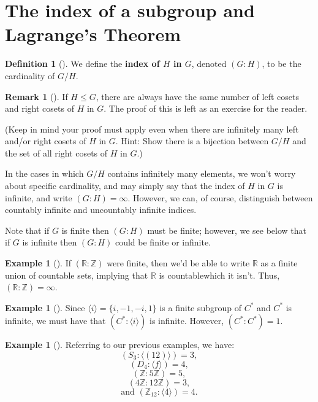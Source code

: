 \documentclass[10pt,]{book}
\newcommand{\terminology}[1]{\textbf{#1}}
\theoremstyle{plain}
\theoremstyle{definition}
\newtheorem{definition}[theorem]{Definition}
\theoremstyle{definition}
\newtheorem{remark}[theorem]{Remark}
\theoremstyle{definition}
\newtheorem{example}[theorem]{Example}
\theoremstyle{definition}
\numberwithin{equation}{section}
\def\Z{\mathbb{Z}}
\def\R{\mathbb{R}}
\begin{document}
\section[{The index of a subgroup and Lagrange's Theorem}]{The index of a subgroup and Lagrange's Theorem}\label{section-24}
\begin{definition}[{}]\label{definition-65}
\label{notation-73}
We define the \terminology{index of \(H\) in \(G\)}, denoted \((G:H)\), to be the cardinality of \(G/H\).%
\end{definition}
\begin{remark}[]\label{remark-41}
If \(H\leq G\), there are always have the same number of left cosets and right cosets of \(H\) in \(G\).  The proof of this is left as an exercise for the reader.%
\par
(Keep in mind your proof must apply even when there are infinitely many left and/or right cosets of \(H\) in \(G\).  Hint: Show there is a bijection between \(G/H\) and the set of all right cosets of \(H\) in \(G\).)%
\end{remark}
In the cases in which \(G/H\) contains infinitely many elements, we won't worry about specific cardinality, and may simply say that the index of \(H\) in \(G\) is infinite, and write \((G:H)=\infty\). However, we can, of course, distinguish between countably infinite and uncountably infinite indices.%
\par
Note that if \(G\) is finite then \((G:H)\) must be finite; however, we see below that if \(G\) is infinite then \((G:H)\) could be finite or infinite.%
\begin{example}[]\label{example-75}
If \((\R:\Z)\) were finite, then we'd be able to write \(\R\) as a finite union of countable sets, implying that \(\R\) is countable\textemdash{}which it isn't. Thus, \((\R:\Z)=\infty\).%
\end{example}
\begin{example}[]\label{example-76}
Since \(\langle i\rangle =\{i,-1,-i,1\}\) is a finite subgroup of \(C^*\) and \(C^*\) is infinite, we must have that \((C^*:\langle i\rangle )\) is infinite. However, \((C^*:C^*)=1\).%
\end{example}
\begin{example}[]\label{indices_ex}
Referring to our previous examples, we have: %
\begin{equation*}
(S_3:\langle (12)\rangle )=3,
\end{equation*}
%
\begin{equation*}
(D_4:\langle f\rangle )=4,
\end{equation*}
%
\begin{equation*}
(\Z:5\Z)=5,
\end{equation*}
%
\begin{equation*}
(4\Z:12\Z)=3,
\end{equation*}
%
\begin{equation*}
\text{and }(\Z_{12}:\langle 4\rangle )=4.
\end{equation*}
%
\end{example}
\end{document}
